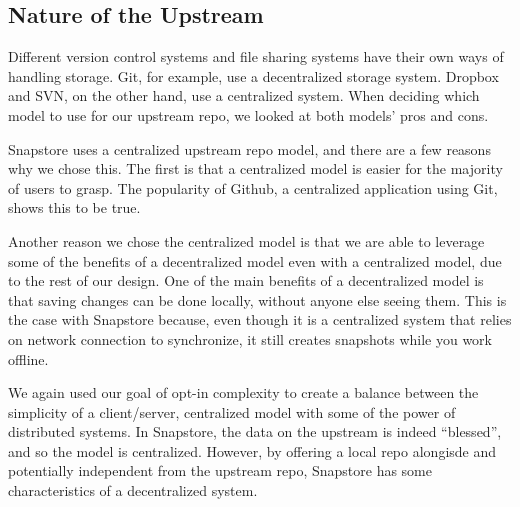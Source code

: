 \subsection{Nature of the Upstream}

Different version control systems and file sharing systems have their own ways of handling storage. Git, for example, use a decentralized storage system. Dropbox and SVN, on the other hand, use a centralized system. When deciding which model to use for our upstream repo, we looked at both models' pros and cons.

Snapstore uses a centralized upstream repo model, and there are a few reasons why we chose this. The first is that a centralized model is easier for the majority of users to grasp. The popularity of Github, a centralized application using Git, shows this to be true.

Another reason we chose the centralized model is that we are able to leverage some of the benefits of a decentralized model even with a centralized model, due to the rest of our design. One of the main benefits of a decentralized model is that saving changes can be done locally, without anyone else seeing them. This is the case with Snapstore because, even though it is a centralized system that relies on network connection to synchronize, it still creates snapshots while you work offline.

We again used our goal of opt-in complexity to create a balance between the simplicity of a client/server, centralized model with some of the power of distributed systems. In Snapstore, the data on the upstream is indeed ``blessed'', and so the model is centralized. However, by offering a local repo alongisde and potentially independent from the upstream repo, Snapstore has some characteristics of a decentralized system.



